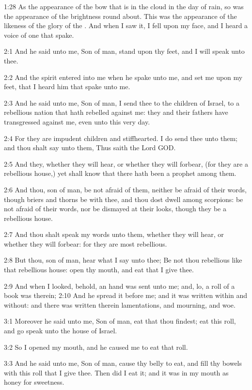 1:28 As the appearance of the bow that is in the cloud in the day of rain, so was the appearance of the brightness round about. This was the appearance of the likeness of the glory of the \LORD. And when I saw it, I fell upon my face, and I heard a voice of one that spake.

2:1 And he said unto me, Son of man, stand upon thy feet, and I will speak unto thee.

2:2 And the spirit entered into me when he spake unto me, and set me upon my feet, that I heard him that spake unto me.

2:3 And he said unto me, Son of man, I send thee to the children of Israel, to a rebellious nation that hath rebelled against me: they and their fathers have transgressed against me, even unto this very day.

2:4 For they are impudent children and stiffhearted. I do send thee unto them; and thou shalt say unto them, Thus saith the Lord GOD.

2:5 And they, whether they will hear, or whether they will forbear, (for they are a rebellious house,) yet shall know that there hath been a prophet among them.

2:6 And thou, son of man, be not afraid of them, neither be afraid of their words, though briers and thorns be with thee, and thou dost dwell among scorpions: be not afraid of their words, nor be dismayed at their looks, though they be a rebellious house.

2:7 And thou shalt speak my words unto them, whether they will hear, or whether they will forbear: for they are most rebellious.

2:8 But thou, son of man, hear what I say unto thee; Be not thou rebellious like that rebellious house: open thy mouth, and eat that I give thee.

2:9 And when I looked, behold, an hand was sent unto me; and, lo, a roll of a book was therein; 2:10 And he spread it before me; and it was written within and without: and there was written therein lamentations, and mourning, and woe.

3:1 Moreover he said unto me, Son of man, eat that thou findest; eat this roll, and go speak unto the house of Israel.

3:2 So I opened my mouth, and he caused me to eat that roll.

3:3 And he said unto me, Son of man, cause thy belly to eat, and fill thy bowels with this roll that I give thee. Then did I eat it; and it was in my mouth as honey for sweetness.

